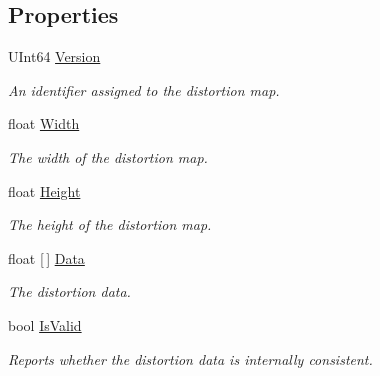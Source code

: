 \subsection*{Properties}
\begin{DoxyCompactItemize}
\item 
U\+Int64 \mbox{\hyperlink{class_leap_1_1_distortion_data_a60b1ec4aa610af0fcf89a78df52b9c17}{Version}}
\begin{DoxyCompactList}\small\item\em An identifier assigned to the distortion map. \end{DoxyCompactList}\item 
float \mbox{\hyperlink{class_leap_1_1_distortion_data_a13e52f4d69488b1781dccfc3ace4ddb5}{Width}}
\begin{DoxyCompactList}\small\item\em The width of the distortion map. \end{DoxyCompactList}\item 
float \mbox{\hyperlink{class_leap_1_1_distortion_data_aa8df661c71691b85d7197a2c9e13792c}{Height}}
\begin{DoxyCompactList}\small\item\em The height of the distortion map. \end{DoxyCompactList}\item 
float \mbox{[}$\,$\mbox{]} \mbox{\hyperlink{class_leap_1_1_distortion_data_a104930e4a0b916ff12a05dd09eb88853}{Data}}
\begin{DoxyCompactList}\small\item\em The distortion data. \end{DoxyCompactList}\item 
bool \mbox{\hyperlink{class_leap_1_1_distortion_data_aeb36d5a10f923ea3067bce076c69e3fd}{Is\+Valid}}
\begin{DoxyCompactList}\small\item\em Reports whether the distortion data is internally consistent. \end{DoxyCompactList}\end{DoxyCompactItemize}


